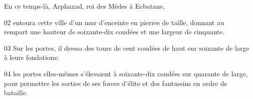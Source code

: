 En ce temps-là, Arphaxad, roi des Mèdes à Ecbatane,

02 entoura cette ville d'un mur d'enceinte en pierres de taille, donnant au rempart une hauteur de soixante-dix coudées et une largeur de cinquante.

03 Sur les portes, il dressa des tours de cent coudées de haut sur soixante de large à leurs fondations;

04 les portes elles-mêmes s'élevaient à soixante-dix coudées sur quarante de large, pour permettre les sorties de ses forces d'élite et des fantassins en ordre de bataille.
